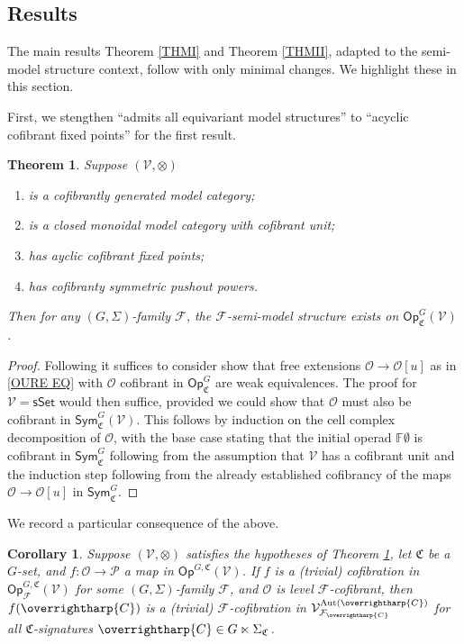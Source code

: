 \documentclass[a4paper,10pt
,draft
]{article}%
\numberwithin{equation}{section}
\numberwithin{figure}{section}
\newtheorem{theorem}[equation]{Theorem}%
\newtheorem{corollary}[equation]{Corollary}%
\theoremstyle{definition} %
\newcommand{\vect}[1]{\text{\overrightharp{\ensuremath{#1}}}}
\newcommand{\Sym}{\ensuremath{\mathsf{Sym}}}%
\newcommand{\sSet}{\ensuremath{\mathsf{sSet}}}%
\newcommand{\Op}{\mathsf{Op}}%
\DeclareMathOperator{\Aut}{Aut}%
\newcommand{\F}{\ensuremath{\mathcal F}}
\newcommand{\V}{\ensuremath{\mathcal V}}
\renewcommand{\O}{\ensuremath{\mathcal O}}
\renewcommand{\P}{\ensuremath{\mathcal P}}
\newcommand{\1}{\ensuremath{\mathbbm 1}}%
\begin{document}
\subsection{Results}

The main results Theorem \ref{THMI} and Theorem \ref{THMII}, adapted to the semi-model structure context, follow with only minimal changes.
We highlight these in this section.

First, we stengthen ``admits all equivariant model structures'' to ``acyclic cofibrant fixed points'' for the first result.
\begin{theorem}
      \label{THM1_S}
      Suppose $(\V,\otimes)$
      \begin{enumerate}[label = (\roman*)]
      \item is a cofibrantly generated model category;
      \item is a closed monoidal model category with cofibrant unit;
      \item has ayclic cofibrant fixed points;
      \item has cofibranty symmetric pushout powers.
      \end{enumerate}
      Then for any $(G, \Sigma)$-family $\F$,
      the $\F$-semi-model structure exists on $\Op^G_{\mathfrak C}(\V)$. 
\end{theorem}
\begin{proof}
      Following \cite[Thm. 2.2.2]{WY18} it suffices to consider show that free extensions $\O \to \O[u]$ as in \eqref{OURE EQ} with $\O$ cofibrant in $\mathsf{Op}^G_{\mathfrak C}$ are weak equivalences.
      The proof for $\V = \sSet$ would then suffice, provided we could show that $\O$ must also be cofibrant in $\Sym^G_{\mathfrak C}(\V)$.
      This follows by induction on the cell complex decomposition of $\O$,
      with the base case stating that the initial operad $\mathbb{F}\emptyset$ is cofibrant in $\mathsf{Sym}^G_{\mathfrak{C}}$
      following from the assumption that $\mathcal{V}$ has a cofibrant unit
      and the induction step following from the already established cofibrancy of the maps $\O \to \O[u]$ in $\mathsf{Sym}^G_{\mathfrak{C}}$.
\end{proof}

We record a particular consequence of the above.
\begin{corollary}
      \label{LGC_COR}
      Suppose $(\V, \otimes)$ satisfies the hypotheses of Theorem \ref{THM1_S},
      let $\mathfrak C$ be a $G$-set, and $f: \O \to \P$ a map in $\Op^{G,\mathfrak C}(\V)$.
      If $f$ is a (trivial) cofibration in $\Op^{G, \mathfrak C}_\F(\V)$ for some $(G, \Sigma)$-family $\F$,
      and $\O$ is level $\F$-cofibrant, then
      $f(\vect C)$ is a (trivial) $\F$-cofibration in $\V^{\Aut(\vect C)}_{\F_{\vect C}}$ for all $\mathfrak C$-signatures $\vect C \in G \ltimes \Sigma_{\mathfrak C}$.
\end{corollary}
\end{document}
